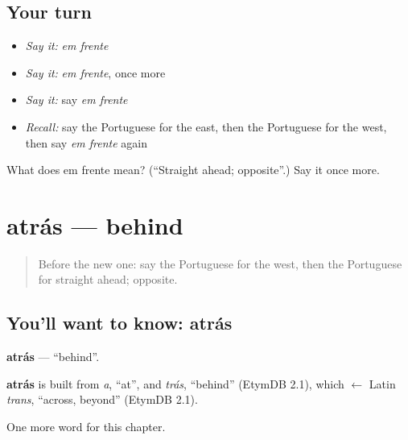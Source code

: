 \subsection*{Your turn}
\begin{itemize}
\raggedright
  \item \emph{Say it:} \emph{em frente}
  \item \emph{Say it:} \emph{em frente}, once more
  \item \emph{Say it:} say \emph{em frente}
  \item \emph{Recall:} say the Portuguese for the east, then the Portuguese for the west, then say \emph{em frente} again
\end{itemize}

\begin{tcolorbox}[breakable,colback=teal!4,colframe=teal!35!black,title={Before you move on}]
What does em frente mean? (\textquotedblleft{}Straight ahead; opposite\textquotedblright{}.) Say it once more.
\end{tcolorbox}
\section[atrás]{atrás — behind}

\label{lesson:PT-C89-atras}



\begin{quote}
Before the new one: say the Portuguese for the west, then the Portuguese for straight ahead; opposite.
\end{quote}

\subsection*{You'll want to know: atrás}
\textbf{atrás} — \textquotedblleft{}behind\textquotedblright{}.

\begin{cousinweb}
\textbf{atrás} is built from \emph{a}, \textquotedblleft{}at\textquotedblright{}, and \emph{trás}, \textquotedblleft{}behind\textquotedblright{} (EtymDB 2.1), which $\leftarrow$ Latin \emph{trans}, \textquotedblleft{}across, beyond\textquotedblright{} (EtymDB 2.1).
\end{cousinweb}

\begin{grammarlens}[title={What you've built}]
One more word for this chapter.
\end{grammarlens}


